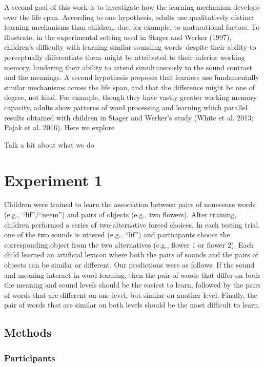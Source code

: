 \documentclass[10pt, letterpaper]{article}
\begin{document}
A second goal of this work is to investigate how the learning mechanism
develops over the life span. According to one hypothesis, adults use
qualitatively distinct learning mechanisms than children, due, for
example, to maturational factors. To illustrate, in the experimental
setting used in Stager and Werker (1997), children's difficulty with
learning similar sounding words--despite their ability to perceptually
differentiate them--might be attributed to their inferior working
memory, hindering their ability to attend simultaneously to the sound
contrast and the meanings. A second hypothesis proposes that learners
use fundamentally similar mechanisms across the life span, and that the
difference might be one of degree, not kind. For example, though they
have vastly greater working memory capacity, adults show patterns of
word processing and learning which parallel results obtained with
children in Stager and Werker's study (White et al. 2013; Pajak et al.
2016). Here we explore

Talk a bit about what we do

\section{Experiment 1}\label{experiment-1}

Children were trained to learn the association between pairs of
nonesense words (e.g., ``lif''/``neem'') and pairs of objects (e.g., two
flowers). After training, children performed a series of two-alternative
forced choices. In each testing trial, one of the two sounds is uttered
(e.g., ``lif'') and participants choose the corresponding object from
the two alternatives (e.g., flower 1 or flower 2). Each child learned an
artificial lexicon where both the pairs of sounds and the pairs of
objects can be similar or different. Our predictions were as follows. If
the sound and meaning interact in word learning, then the pair of words
that differ on both the meaning and sound levels should be the easiest
to learn, followed by the pairs of words that are different on one
level, but similar on another level. Finally, the pair of words that are
similar on both levels should be the most difficult to learn.

\subsection{Methods}\label{methods}

\subsubsection{Participants}\label{participants}
\end{document}
